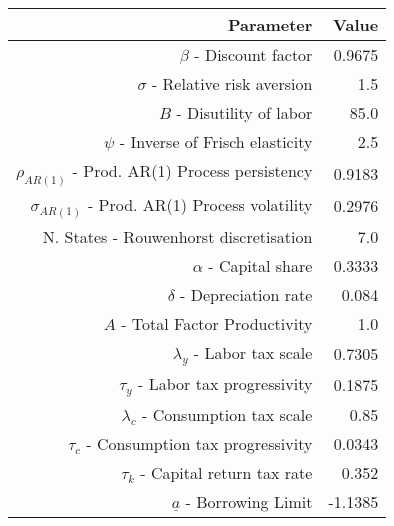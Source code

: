 \begin{tabular}{rr}
  \hline
  \textbf{Parameter} & \textbf{Value} \\\hline
  $\beta$ - Discount factor & 0.9675 \\
  $\sigma$ - Relative risk aversion & 1.5 \\
  $B$ - Disutility of labor & 85.0 \\
  $\psi$ - Inverse of Frisch elasticity & 2.5 \\
  $\rho_{AR(1)}$ - Prod. AR(1) Process persistency & 0.9183 \\
  $\sigma_{AR(1)}$ - Prod. AR(1) Process volatility & 0.2976 \\
  N. States - Rouwenhorst discretisation & 7.0 \\
  $\alpha$ - Capital share & 0.3333 \\
  $\delta$ - Depreciation rate & 0.084 \\
  $A$ - Total Factor Productivity & 1.0 \\
  $\lambda_y$ - Labor tax scale & 0.7305 \\
  $\tau_y$ - Labor tax progressivity & 0.1875 \\
  $\lambda_c$ - Consumption tax scale & 0.85 \\
  $\tau_c$ - Consumption tax progressivity & 0.0343 \\
  $\tau_k$ - Capital return tax rate & 0.352 \\
  $\underline{a}$ - Borrowing Limit & -1.1385 \\\hline
\end{tabular}
